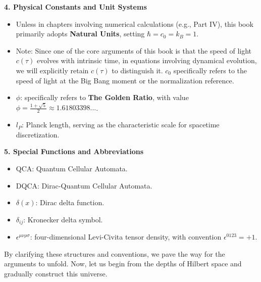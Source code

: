 \textbf{4. Physical Constants and Unit Systems}
\begin{itemize}
\item Unless in chapters involving numerical calculations (e.g., Part IV), this book primarily adopts \textbf{Natural Units}, setting $\hbar = c_0 = k_B = 1$.
\item Note: Since one of the core arguments of this book is that the speed of light $c(\tau)$ evolves with intrinsic time, in equations involving dynamical evolution, we will explicitly retain $c(\tau)$ to distinguish it. $c_0$ specifically refers to the speed of light at the Big Bang moment or the normalization reference.
\item $\phi$: specifically refers to \textbf{The Golden Ratio}, with value $\phi = \frac{1+\sqrt{5}}{2} \approx 1.61803398...$.
\item $l_P$: Planck length, serving as the characteristic scale for spacetime discretization.
\end{itemize}

\textbf{5. Special Functions and Abbreviations}
\begin{itemize}
\item QCA: Quantum Cellular Automata.
\item DQCA: Dirac-Quantum Cellular Automata.
\item $\delta(x)$: Dirac delta function.
\item $\delta_{ij}$: Kronecker delta symbol.
\item $\epsilon^{\mu\nu\rho\sigma}$: four-dimensional Levi-Civita tensor density, with convention $\epsilon^{0123} = +1$.
\end{itemize}

By clarifying these structures and conventions, we pave the way for the arguments to unfold. Now, let us begin from the depths of Hilbert space and gradually construct this universe.
